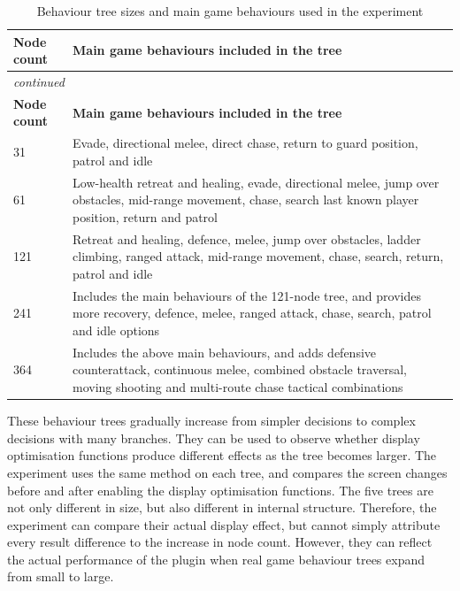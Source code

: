 \documentclass[11pt,a4paper,oneside,extrafontsizes]{memoir}
\begin{document}
\begin{center}

\begin{longtable}{@{}p{} p{}@{}}
\caption{Behaviour tree sizes and main game behaviours used in the experiment}\label{tab:experiment-tree-sizes}\\
\toprule
\textbf{Node count} & \textbf{Main game behaviours included in the tree} \\
\midrule
\endfirsthead
\multicolumn{2}{l}{\itshape continued}\\
\toprule
\textbf{Node count} & \textbf{Main game behaviours included in the tree} \\
\midrule
\endhead
31 & Evade, directional melee, direct chase, return to guard position, patrol and idle \\
61 & Low-health retreat and healing, evade, directional melee, jump over obstacles, mid-range movement, chase, search last known player position, return and patrol \\
121 & Retreat and healing, defence, melee, jump over obstacles, ladder climbing, ranged attack, mid-range movement, chase, search, return, patrol and idle \\
241 & Includes the main behaviours of the 121-node tree, and provides more recovery, defence, melee, ranged attack, chase, search, patrol and idle options \\
364 & Includes the above main behaviours, and adds defensive counterattack, continuous melee, combined obstacle traversal, moving shooting and multi-route chase tactical combinations \\
\bottomrule
\end{longtable}
\end{center}

These behaviour trees gradually increase from simpler decisions to complex decisions with many branches. They can be used to observe whether display optimisation functions produce different effects as the tree becomes larger. The experiment uses the same method on each tree, and compares the screen changes before and after enabling the display optimisation functions. The five trees are not only different in size, but also different in internal structure. Therefore, the experiment can compare their actual display effect, but cannot simply attribute every result difference to the increase in node count. However, they can reflect the actual performance of the plugin when real game behaviour trees expand from small to large.
\end{document}
